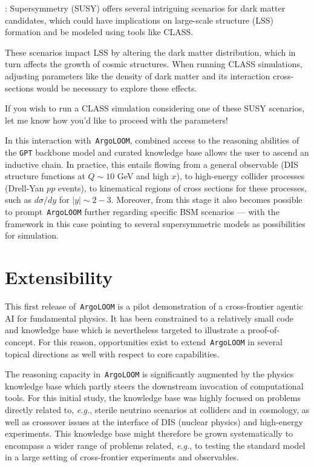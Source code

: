 \documentclass[final,3p,times,sort,compress]{elsarticle}
\newcommand{\AL}{\texttt{ArgoLOOM}\xspace}
\begin{document}
\begin{terminalbox}
\begin{terminal}
[assistant]: Supersymmetry (SUSY) offers several intriguing scenarios for dark matter candidates, which could have implications on large-scale structure (LSS) formation and be modeled using tools like CLASS.

These scenarios impact LSS by altering the dark matter distribution, which in turn affects the growth of cosmic structures. When running CLASS simulations, adjusting parameters like the density of dark matter and its interaction cross-sections would be necessary to explore these effects.

If you wish to run a CLASS simulation considering one of these SUSY scenarios, let me know how you'd like to proceed with the parameters!
\end{terminal}
\end{terminalbox}

In this interaction with~\AL, combined access to the reasoning abilities of the \texttt{GPT} backbone model and curated knowledge base allows the user to ascend an inductive chain. In practice, this entails flowing from a general observable (DIS structure functions at $Q\!\sim\!10$ GeV and high $x$), to high-energy collider processes (Drell-Yan $pp$ events), to kinematical regions of cross sections for these processes, such as $d\sigma /dy$ for $|y|\!\sim\!2\!-\!3$.
%
Moreover, from this stage it also becomes possible to prompt~\AL further regarding specific BSM scenarios --- with the framework in this case pointing to several supersymmetric models as possibilities for simulation.
%


\section{Extensibility}
\label{sec:extend}
%
%
This first release of~\AL is a pilot demonstration of a cross-frontier agentic AI
for fundamental physics.
%
It has been constrained to a relatively small code and knowledge base which
is nevertheless targeted to illustrate a proof-of-concept.
%
For this reason, opportunities exist to extend~\AL in several topical
directions as well with respect to core capabilities.
%

The reasoning capacity in~\AL is significantly augmented
by the physics knowledge base which partly steers the downstream invocation of
computational tools. For this initial study, the knowledge base was highly
focused on problems directly related to, {\it e.g.}, sterile neutrino scenarios
at colliders and in cosmology, as well as crossover issues at the interface of
DIS (nuclear physics) and high-energy experiments.
%
This knowledge base might therefore be grown systematically to encompass a wider
range of problems related, {\it e.g.}, to testing the standard model in a large
setting of cross-frontier experiments and observables.
\end{document}
